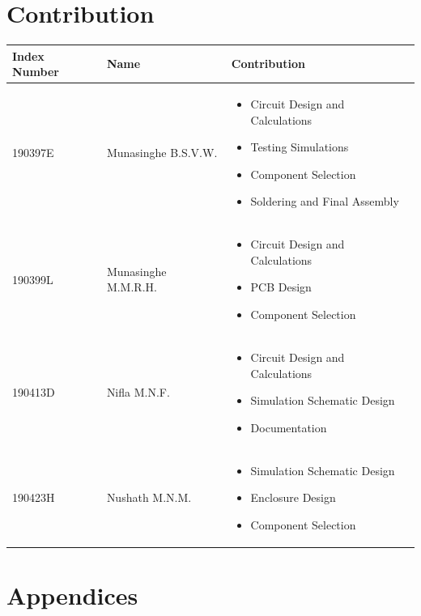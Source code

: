\documentclass[11pt]{article}
\begin{document}
\section{Contribution}
\begin{center}
\begin{tabular}{ |m{2.5cm}|m{4cm}|m{6cm}| } 
 \hline
 Index Number & Name & Contribution \\ 
 \hline
 190397E & Munasinghe B.S.V.W. & 
 \begin{itemize} 
            \item Circuit Design and Calculations 
            \item Testing Simulations 
            \item Component Selection 
            \item Soldering and Final Assembly
        \end{itemize}  \\ 
 \hline
 190399L & Munasinghe M.M.R.H. &
 \begin{itemize} 
            \item Circuit Design and Calculations
            \item PCB Design
            \item Component Selection 
        \end{itemize}  \\ 
 \hline
 190413D & Nifla M.N.F. &
 \begin{itemize} 
            \item Circuit Design and Calculations
            \item Simulation Schematic Design 
            \item Documentation 
        \end{itemize}  \\ 
 \hline
 190423H & Nushath M.N.M. &
 \begin{itemize} 
            \item Simulation Schematic Design
            \item Enclosure Design 
            \item Component Selection  
        \end{itemize}  \\ 
 \hline
\end{tabular}
\end{center}


\section{Appendices}
\end{document}
